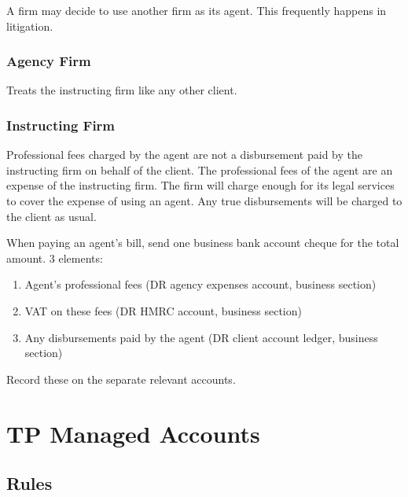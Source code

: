 \documentclass[
]{article}
\providecommand{\tightlist}{%
  \setlength{\itemsep}{0pt}\setlength{\parskip}{0pt}}
\begin{document}
A firm may decide to use another firm as its agent. This frequently
happens in litigation.

\hypertarget{agency-firm}{%
\subsubsection{Agency Firm}\label{agency-firm}}

Treats the instructing firm like any other client.

\hypertarget{instructing-firm}{%
\subsubsection{Instructing Firm}\label{instructing-firm}}

Professional fees charged by the agent are not a disbursement paid by
the instructing firm on behalf of the client. The professional fees of
the agent are an expense of the instructing firm. The firm will charge
enough for its legal services to cover the expense of using an agent.
Any true disbursements will be charged to the client as usual.

When paying an agent's bill, send one business bank account cheque for
the total amount. 3 elements:

\begin{enumerate}
\def\labelenumi{\arabic{enumi}.}
\tightlist
\item
  Agent's professional fees (DR agency expenses account, business
  section)
\item
  VAT on these fees (DR HMRC account, business section)
\item
  Any disbursements paid by the agent (DR client account ledger,
  business section)
\end{enumerate}

Record these on the separate relevant accounts.

\hypertarget{tp-managed-accounts}{%
\section{TP Managed Accounts}\label{tp-managed-accounts}}

\hypertarget{rules}{%
\subsection{Rules}\label{rules}}
\end{document}
